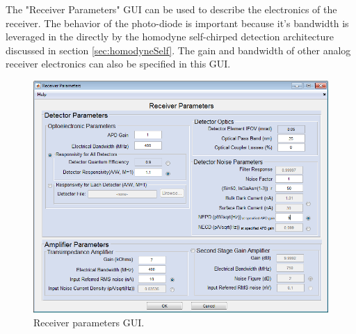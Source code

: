 The "Receiver Parameters" GUI can be used to describe the electronics of the receiver. The behavior of the photo-diode is important 
because it's bandwidth is leveraged in the directly by the homodyne self-chirped detection architecture discussed in section \ref{sec:homodyneSelf}. The gain and bandwidth of other analog receiver electronics can also be specified in this GUI. 
\begin{figure}[!htb]
	\centering
	\includegraphics[width=.8\columnwidth]{figs/RxParamGUI}
	\vspace{1em}
	\caption{Receiver parameters GUI.}
	\label{fig:dopRXGUI}
\end{figure} 

